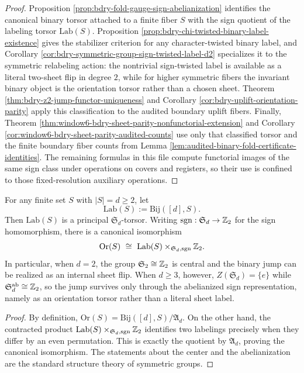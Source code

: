 \begin{proof}
Proposition \ref{prop:bdry-fold-gauge-sign-abelianization} identifies the canonical binary torsor attached to a finite fiber \(S\) with the sign quotient of the labeling torsor \(\mathrm{Lab}(S)\).  Proposition \ref{prop:bdry-chi-twisted-binary-label-existence} gives the stabilizer criterion for any character-twisted binary label, and Corollary \ref{cor:bdry-symmetric-group-sign-twisted-label-d2} specializes it to the symmetric relabeling action: the nontrivial sign-twisted label is available as a literal two-sheet flip in degree \(2\), while for higher symmetric fibers the invariant binary object is the orientation torsor rather than a chosen sheet.  Theorem \ref{thm:bdry-z2-jump-functor-uniqueness} and Corollary \ref{cor:bdry-uplift-orientation-parity} apply this classification to the audited boundary uplift fibers.  Finally, Theorem \ref{thm:window6-bdry-sheet-parity-nonfunctorial-extension} and Corollary \ref{cor:window6-bdry-sheet-parity-audited-counts} use only that classified torsor and the finite boundary fiber counts from Lemma \ref{lem:audited-binary-fold-certificate-identities}.  The remaining formulas in this file compute functorial images of the same sign class under operations on covers and registers, so their use is confined to those fixed-resolution auxiliary operations. \qedhere
\end{proof}

\begin{proposition}\label{prop:bdry-fold-gauge-sign-abelianization}
For any finite set \(S\) with \(|S|=d\ge 2\), let
\[
\mathrm{Lab}(S):=\mathrm{Bij}([d],S).
\]
Then \(\mathrm{Lab}(S)\) is a principal \(\mathfrak S_d\)-torsor.
Writing \(\mathrm{sgn}:\mathfrak S_d\to\mathbb{Z}_2\) for the sign homomorphism, there is a canonical isomorphism
\[
\mathrm{Or}(S)\ \cong\ \mathrm{Lab}(S)\times_{\mathfrak S_d,\mathrm{sgn}}\ZZ_2.
\]
In particular, when \(d=2\), the group \(\mathfrak S_2\cong\mathbb{Z}_2\) is central and the binary jump can be realized as an internal sheet flip.
When \(d\ge 3\), however, \(Z(\mathfrak S_d)=\{e\}\) while \(\mathfrak S_d^{\mathrm{ab}}\cong\mathbb{Z}_2\), so the jump survives only through the abelianized sign representation, namely as an orientation torsor rather than a literal sheet label.
\end{proposition}

\begin{proof}
By definition, \(\mathrm{Or}(S)=\mathrm{Bij}([d],S)/\mathfrak A_d\).
On the other hand, the contracted product \(\mathrm{Lab}(S)\times_{\mathfrak S_d,\mathrm{sgn}}\mathbb{Z}_2\) identifies two labelings precisely when they differ by an even permutation.
This is exactly the quotient by \(\mathfrak A_d\), proving the canonical isomorphism.
The statements about the center and the abelianization are the standard structure theory of symmetric groups. \qedhere
\end{proof}

